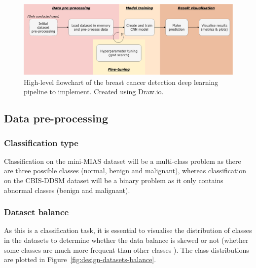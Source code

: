 \begin{figure}[ht]
\centerline{\includegraphics[width=1.1\textwidth]{Dissertation/figures/design/design flowchart.png}}
\caption{\label{fig:design-flowchart}High-level flowchart of the breast cancer detection deep learning pipeline to implement. Created using Draw.io.}
\end{figure}


\subsection{Data pre-processing}

\subsubsection{Classification type}

Classification on the mini-MIAS dataset will be a multi-class problem as there are three possible classes (normal, benign and malignant), whereas classification on the CBIS-DDSM dataset will be a binary problem as it only contains abnormal classes (benign and malignant).

\subsubsection{Dataset balance}

As this is a classification task, it is essential to visualise the distribution of classes in the datasets to determine whether the data balance is skewed or not (whether some classes are much more frequent than other classes \citep{Geron2019}). The class distributions are plotted in Figure~\ref{fig:design-datasets-balance}.

